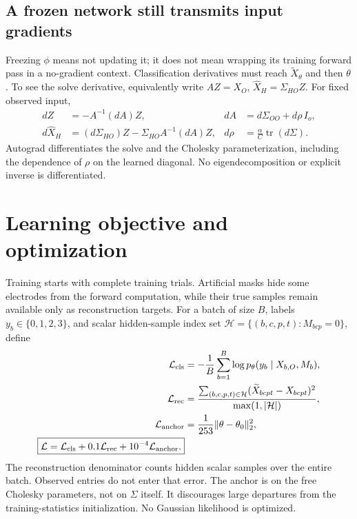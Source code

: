 \documentclass[11pt,a4paper]{article}
\newcommand{\tr}{\operatorname{tr}}
\begin{document}
\subsection{A frozen network still transmits input gradients}
Freezing $\phi$ means not updating it; it does not mean wrapping its training
forward pass in a no-gradient context. Classification derivatives must reach
$\widetilde X_\theta$ and then $\theta$. To see the solve derivative, equivalently
write $AZ=X_O$, $\widehat X_H=\Sigma_{HO}Z$. For fixed observed input,
\begin{align}
 dZ&=-A^{-1}(dA)Z, & dA&=d\Sigma_{OO}+d\rho\,I_o,\\
 d\widehat X_H&=(d\Sigma_{HO})Z-\Sigma_{HO}A^{-1}(dA)Z,
 & d\rho&=\frac{\alpha}{C}\tr(d\Sigma).
\end{align}
Autograd differentiates the solve and the Cholesky parameterization, including
the dependence of $\rho$ on the learned diagonal. No eigendecomposition or
explicit inverse is differentiated.

\newpage
\section{Learning objective and optimization}
Training starts with complete training trials. Artificial masks hide some
electrodes from the forward computation, while their true samples remain
available only as reconstruction targets. For a batch of size $B$, labels
$y_b\in\{0,1,2,3\}$, and scalar hidden-sample index set
$\mathcal H=\{(b,c,p,t):M_{bcp}=0\}$, define
\begin{align}
 \mathcal L_{\rm cls}
  &=-\frac1B\sum_{b=1}^B\log p_\theta(y_b\mid X_{b,O},M_b),\\
 \mathcal L_{\rm rec}
  &=\frac{\sum_{(b,c,p,t)\in\mathcal H}
       (\widetilde X_{bcpt}-X_{bcpt})^2}{\max(1,|\mathcal H|)},\\
 \mathcal L_{\rm anchor}
  &=\frac1{253}\|\theta-\theta_0\|_2^2,\\
 \boxed{\mathcal L
  =\mathcal L_{\rm cls}+0.1\mathcal L_{\rm rec}
    +10^{-4}\mathcal L_{\rm anchor}.}
 \label{eq:loss}
\end{align}
The reconstruction denominator counts hidden scalar samples over the entire
batch. Observed entries do not enter that error. The anchor is on the free
Cholesky parameters, not on $\Sigma$ itself. It discourages large departures
from the training-statistics initialization. No Gaussian likelihood is optimized.
\end{document}

